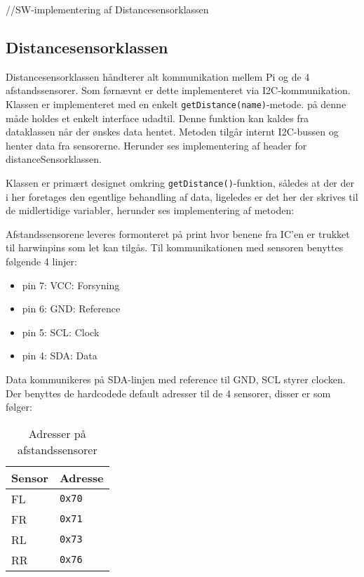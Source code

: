 //SW-implementering af Distancesensorklassen
\subsection{Distancesensorklassen}

Distancesensorklassen håndterer alt kommunikation mellem Pi og de 4 afstandssensorer. Som førnævnt er dette implementeret via I2C-kommunikation. Klassen er implementeret med en enkelt \texttt{getDistance(name)}-metode. på denne måde holdes et enkelt interface udadtil. Denne funktion kan kaldes fra dataklassen når der ønskes data hentet. Metoden tilgår internt I2C-bussen og henter data fra sensorerne. Herunder ses implementering af header for distanceSensorklassen.



Klassen er primært designet omkring \texttt{getDistance()}-funktion, således at der der i her foretages den egentlige behandling af data, ligeledes er det her der skrives til de midlertidige variabler, herunder ses implementering af metoden: 



Afstandssensorene leveres formonteret på print hvor benene fra IC'en er trukket til harwinpins som let kan tilgås. Til kommunikationen med sensoren benyttes følgende 4 linjer: 

\begin{itemize}
	\item pin 7: VCC: Forsyning
	\item pin 6: GND: Reference
	\item pin 5: SCL: Clock
	\item pin 4: SDA: Data
\end{itemize}

Data kommunikeres på SDA-linjen med reference til GND,  SCL styrer clocken.
Der benyttes de hardcodede default adresser til de 4 sensorer, disser er som følger: 

\begin{table}[h]\centering
	\begin{tabular}{| l | l |} \hline
		\textbf{Sensor} 	& \textbf{Adresse}  \\\hline
		FL 					& \texttt{0x70} 	\\\hline
		FR 					& \texttt{0x71} 	\\\hline
		RL 					& \texttt{0x73} 	\\\hline
		RR 					& \texttt{0x76} 	\\\hline
	\end{tabular}
	\caption{Adresser på afstandssensorer}
	\label{table:adr_afstandssensorer}
\end{table}

